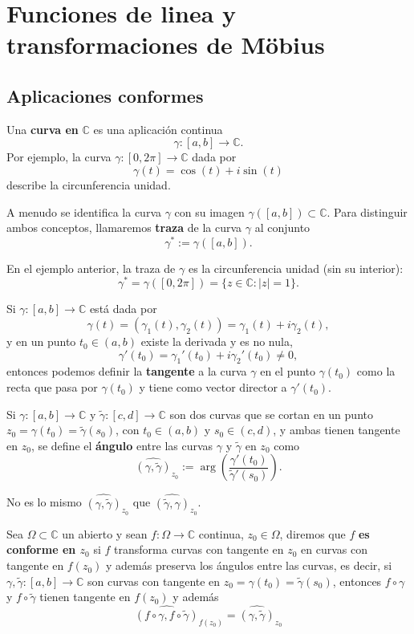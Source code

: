 \section{Funciones de linea y transformaciones de Möbius}
\subsection{Aplicaciones conformes}

Una \textbf{curva en} $\mathbb{C}$ es una aplicación continua
\[
    \gamma : [a,b] \to \mathbb{C}.
\]
Por ejemplo, la curva $\gamma : [0,2\pi] \to \mathbb{C}$ dada por
\[
    \gamma(t) = \cos(t) + i\sin(t)
\]
describe la circunferencia unidad.

A menudo se identifica la curva $\gamma$ con su imagen $\gamma([a,b]) \subset \mathbb{C}$. 
Para distinguir ambos conceptos, llamaremos \textbf{traza} de la curva $\gamma$ al conjunto
\[
    \gamma^* := \gamma([a,b]).
\]

En el ejemplo anterior, la traza de $\gamma$ es la circunferencia unidad (sin su interior):
\[
    \gamma^* = \gamma([0,2\pi]) = \{z \in \mathbb{C} : |z| = 1\}.
\]

Si $\gamma : [a,b] \to \mathbb{C}$ está dada por
\[
    \gamma(t) = (\gamma_1(t), \gamma_2(t)) = \gamma_1(t) + i\gamma_2(t),
\]
y en un punto $t_0 \in (a,b)$ existe la derivada y es no nula,
\[
    \gamma'(t_0) = \gamma_1'(t_0) + i\gamma_2'(t_0) \neq 0,
\]
entonces podemos definir la \textbf{tangente} a la curva $\gamma$ en el punto $\gamma(t_0)$
como la recta que pasa por $\gamma(t_0)$ y tiene como vector director a $\gamma'(t_0)$.

Si $\gamma : [a,b] \to \mathbb{C}$ y $\tilde{\gamma} : [c,d] \to \mathbb{C}$ son dos curvas 
que se cortan en un punto $z_0 = \gamma(t_0) = \tilde{\gamma}(s_0)$, con 
$t_0 \in (a,b)$ y $s_0 \in (c,d)$, y ambas tienen tangente en $z_0$, 
se define el \textbf{ángulo} entre las curvas $\gamma$ y $\tilde{\gamma}$ en $z_0$ como
\[
    \widehat{(\gamma, \tilde{\gamma})}_{z_0} := 
    \arg\!\left(\frac{\gamma'(t_0)}{\tilde{\gamma}'(s_0)}\right).
\]

\begin{observación}
    No es lo mismo $\widehat{(\gamma, \tilde{\gamma})}_{z_0}$ que $\widehat{(\tilde{\gamma}, \gamma)}_{z_0}$.
\end{observación}

\begin{definición}
    Sea $\Omega \subset \mathbb{C}$ un abierto y sean $f : \Omega \to \mathbb{C}$ continua, $z_0 \in \Omega$, diremos que $f$ \textbf{es conforme en $z_0$} si $f$ transforma curvas con tangente en $z_0$ en curvas con tangente en $f(z_0)$ y además preserva los ángulos entre las curvas, es decir, si $\gamma, \tilde{\gamma} : [a,b] \to \mathbb{C}$ son curvas con tangente en $z_0 = \gamma(t_0) = \tilde{\gamma}(s_0)$, entonces $f \circ \gamma$ y $f \circ \tilde{\gamma}$ tienen tangente en $f(z_0)$ y además
\[
    \widehat{(f \circ \gamma, f \circ \tilde{\gamma})}_{f(z_0)} = \widehat{(\gamma, \tilde{\gamma})}_{z_0}
\]
\end{definición}


